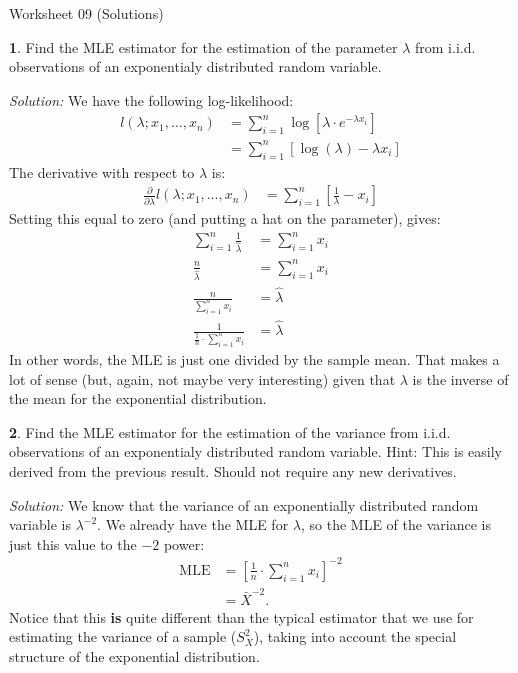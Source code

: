 \documentclass{tufte-handout}
\begin{document}
\justify

{\LARGE Worksheet 09 (Solutions)}

\vspace*{18pt}


\textbf{1}. Find the MLE estimator for the estimation of the parameter $\lambda$ from
i.i.d. observations of an exponentialy distributed random variable.

\textit{Solution:} We have the following log-likelihood:
\begin{align*}
l(\lambda; x_1, \ldots, x_n) &= \sum_{i=1}^n \log\left[ \lambda \cdot e^{-\lambda x_i} \right] \\
&= \sum_{i=1}^n \left[\log(\lambda) - \lambda x_i \right]
\end{align*}
The derivative with respect to $\lambda$ is:
\begin{align*}
\frac{\partial}{\partial \lambda} l(\lambda; x_1, \ldots, x_n)
&= \sum_{i=1}^n \left[ \frac{1}{\lambda} - x_i \right] 
\end{align*}
Setting this equal to zero (and putting a hat on the parameter), gives:
\begin{align*}
\sum_{i=1}^n \frac{1}{\hat{\lambda}} &= \sum_{i=1}^n x_i \\
\frac{n}{\hat{\lambda}} &= \sum_{i=1}^n x_i \\
\frac{n}{\sum_{i=1}^n x_i} &= \hat{\lambda} \\
\frac{1}{\frac{1}{n} \cdot \sum_{i=1}^n x_i} &= \hat{\lambda} 
\end{align*}
In other words, the MLE is just one divided by the sample mean. That makes
a lot of sense (but, again, not maybe very interesting) given that $\lambda$
is the inverse of the mean for the exponential distribution.

\textbf{2}. Find the MLE estimator for the estimation of the variance from
i.i.d. observations of an exponentialy distributed random variable.
Hint: This is easily derived from the previous result. Should not 
require any new derivatives.

\textit{Solution:} We know that the variance of an exponentially distributed random variable
is $\lambda^{-2}$. We already have the MLE for $\lambda$, so the MLE of the
variance is just this value to the $-2$ power:
\begin{align*}
\text{MLE} &= \left[ \frac{1}{n} \cdot \sum_{i=1}^n x_i \right]^{-2} \\
&= \bar{X}^{-2}.
\end{align*}
Notice that this \textbf{is} quite different than the typical estimator that
we use for estimating the variance of a sample ($S_X^2$), taking into account
the special structure of the exponential distribution.
\end{document}
